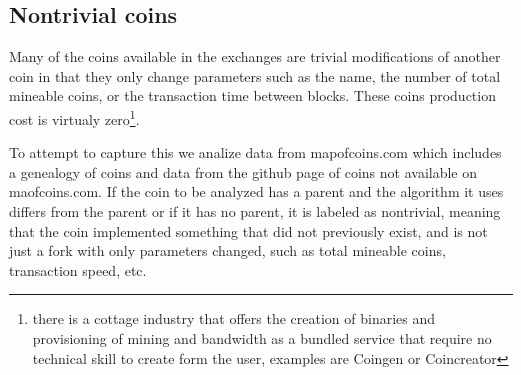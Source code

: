 \subsection{Nontrivial coins}

Many of the coins available in the exchanges are trivial modifications of another coin in that they only change parameters such as the name, the number of total mineable coins, or the transaction time between blocks.
These coins production cost is virtualy zero\footnote{ there is a cottage industry that offers the creation of binaries and provisioning of mining and bandwidth as a bundled service that require no technical skill to create form the user, examples are Coingen or Coincreator}.

To attempt to capture this we analize data from mapofcoins.com which includes a genealogy of coins and data from the github page of coins not available on maofcoins.com.
If the coin to be analyzed has a parent and the algorithm it uses differs from the parent or if it has no parent, it is labeled as nontrivial, meaning that the coin implemented something that did not previously exist, and is not just a fork with only parameters changed, such as total mineable coins, transaction speed, etc.

